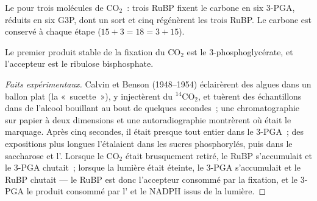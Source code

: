 \begin{omfigure}

{\small Le  pour trois molécules de $\mathrm{CO_2}$~:
trois RuBP fixent le carbone en six 3-PGA, réduits en six G3P, dont un
sort et cinq régénèrent les trois RuBP. Le carbone est conservé à chaque
étape ($15 + 3 = 18 = 3 + 15$).}
\end{omfigure}

\begin{proposition}\label{prop:b1:photosynthesis:calvin}
Le premier produit stable de la fixation du $\mathrm{CO_2}$ est le
3-phosphoglycérate, et l'accepteur est le ribulose bisphosphate.
\end{proposition}
\begin{proof}[Faits expérimentaux]
Calvin et Benson (1948--1954) éclairèrent des algues dans un ballon plat
(la «~sucette~»), y injectèrent du $\mathrm{^{14}CO_2}$, et tuèrent des
échantillons dans de l'alcool bouillant au bout de quelques secondes~;
une chromatographie sur papier à deux dimensions et une autoradiographie
montrèrent où était le marquage. Après cinq secondes, il était presque
tout entier dans le 3-PGA~; des expositions plus longues l'étalaient
dans les sucres phosphorylés, puis dans le saccharose et l'.
Lorsque le $\mathrm{CO_2}$ était brusquement retiré, le RuBP s'accumulait
et le 3-PGA chutait~; lorsque la lumière était éteinte, le 3-PGA
s'accumulait et le RuBP chutait --- le RuBP est donc l'accepteur
consommé par la fixation, et le 3-PGA le produit consommé par l' et
le NADPH issus de la lumière.
\end{proof}

